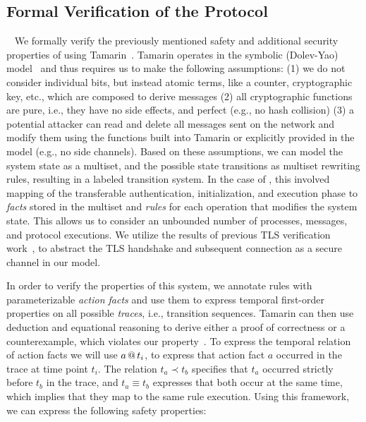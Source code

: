 

\subsection{Formal Verification of the \projecttitle{} Protocol}~\label{sec:formal-verif}
We formally verify the previously mentioned safety and additional security properties of \projecttitle{} using Tamarin~\cite{tamarin-prover}. Tamarin operates in the symbolic (Dolev-Yao) model~\cite{dolev-yao-model} and thus requires us to make the following assumptions: (1) we do not consider individual bits, but instead atomic terms, like a counter, cryptographic key, etc., which are composed to derive messages (2) all cryptographic functions are pure, i.e., they have no side effects, and perfect (e.g., no hash collision) (3) a potential attacker can read and delete all messages sent on the network and modify them using the functions built into Tamarin or explicitly provided in the model (e.g., no side channels). Based on these assumptions, we can model the system state as a multiset, and the possible state transitions as multiset rewriting rules, resulting in a labeled transition system. In the case of \projecttitle{}, this involved mapping of the transferable authentication, initialization, and execution phase to \textit{facts} stored in the multiset and \textit{rules} for each operation that modifies the system state. This allows us to consider an unbounded number of processes, messages, and protocol executions. We utilize the results of previous TLS verification work~\cite{tls-proof1,tls-proof2,tamarin-tls-proof}, to abstract the TLS handshake and subsequent connection as a secure channel in our model.

In order to verify the properties of this system, we annotate rules with parameterizable \textit{action facts} and use them to express temporal first-order properties on all possible \textit{traces}, i.e., transition sequences. Tamarin can then use deduction and equational reasoning to derive either a proof of correctness or a counterexample, which violates our property~\cite{tamarin-prover}. To express the temporal relation of action facts we will use \(a\,@\,{}t_i\), to express that action fact \(a\) occurred in the trace at time point \(t_i\). The relation \(t_a \prec t_b\) specifies that \(t_a\) occurred strictly before \(t_b\) in the trace, and \(t_a \equiv t_b\) expresses that both occur at the same time, which implies that they map to the same rule execution. Using this framework, we can express the following safety properties:

